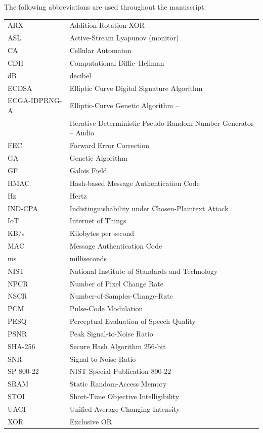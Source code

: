\documentclass[pdflatex,sn-mathphys-num]{sn-jnl}%
\theoremstyle{thmstyleone}%
\theoremstyle{thmstyletwo}%
\theoremstyle{thmstylethree}%
\begin{document}
The following abbreviations are used throughout the manuscript:

\begin{tabular}{@{}ll@{}}
ARX & Addition-Rotation-XOR \\
ASL & Active-Stream Lyapunov (monitor) \\
CA & Cellular Automaton \\
CDH & Computational Diffie--Hellman \\
dB & decibel \\
ECDSA & Elliptic Curve Digital Signature Algorithm \\
ECGA-IDPRNG-A & Elliptic-Curve Genetic Algorithm -- \\  &Iterative Deterministic Pseudo-Random Number Generator -- Audio \\
FEC & Forward Error Correction \\
GA & Genetic Algorithm \\
GF & Galois Field \\
HMAC & Hash-based Message Authentication Code \\
Hz & Hertz \\
IND-CPA & Indistinguishability under Chosen-Plaintext Attack \\
IoT & Internet of Things \\
KB/s & Kilobytes per second \\
MAC & Message Authentication Code \\
ms & milliseconds \\
NIST & National Institute of Standards and Technology \\
NPCR & Number of Pixel Change Rate \\
NSCR & Number-of-Samples-Change-Rate \\
PCM & Pulse-Code Modulation \\
PESQ & Perceptual Evaluation of Speech Quality \\
PSNR & Peak Signal-to-Noise Ratio \\
SHA-256 & Secure Hash Algorithm 256-bit \\
SNR & Signal-to-Noise Ratio \\
SP 800-22 & NIST Special Publication 800-22 \\
SRAM & Static Random-Access Memory \\
STOI & Short-Time Objective Intelligibility \\
UACI & Unified Average Changing Intensity \\
XOR & Exclusive OR \\
\end{tabular}
\end{document}
